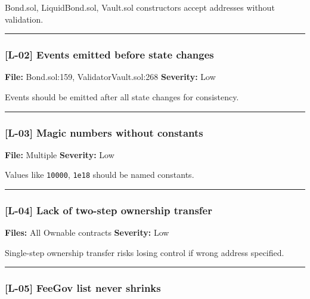 \documentclass[
]{article}
\begin{document}
Bond.sol, LiquidBond.sol, Vault.sol constructors accept addresses
without validation.

\begin{center}\rule{0.5\linewidth}{0.5pt}\end{center}

\subsubsection{{[}L-02{]} Events emitted before state
changes}\label{l-02-events-emitted-before-state-changes}

\textbf{File:} Bond.sol:159, ValidatorVault.sol:268 \textbf{Severity:}
Low

Events should be emitted after all state changes for consistency.

\begin{center}\rule{0.5\linewidth}{0.5pt}\end{center}

\subsubsection{{[}L-03{]} Magic numbers without
constants}\label{l-03-magic-numbers-without-constants}

\textbf{File:} Multiple \textbf{Severity:} Low

Values like \texttt{10000}, \texttt{1e18} should be named constants.

\begin{center}\rule{0.5\linewidth}{0.5pt}\end{center}

\subsubsection{{[}L-04{]} Lack of two-step ownership
transfer}\label{l-04-lack-of-two-step-ownership-transfer}

\textbf{Files:} All Ownable contracts \textbf{Severity:} Low

Single-step ownership transfer risks losing control if wrong address
specified.

\begin{center}\rule{0.5\linewidth}{0.5pt}\end{center}

\subsubsection{{[}L-05{]} FeeGov list never
shrinks}\label{l-05-feegov-list-never-shrinks}
\end{document}
